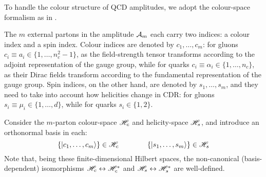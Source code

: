 To handle the colour structure of QCD amplitudes, we adopt the colour-space formalism as in \cite{Catani-1997}.

The $ m $ external partons in the amplitude $ \mathcal{A}_m $ each carry two indices: a colour index and a spin index. Colour indices are denoted by $ c_1, \dots, c_m $: for gluons $ c_i \equiv a_i \in \{1, \dots, n_c^2 - 1\} $, as the field-strength tensor  transforms according to the adjoint representation of the gauge group, while for quarks $ c_i \equiv \alpha_i \in \{1, \dots, n_c\} $, as their Dirac fields transform according to the fundamental representation of the gauge group. Spin indices, on the other hand, are denoted by $ s_1, \dots, s_m $, and they need to take into account how helicities change in CDR: for gluons $ s_i \equiv \mu_i \in \{1, \dots, d\} $, while for quarks $ s_i \in \{1,2\} $.

Consider the $ m $-parton colour-space $ \mathscr{H}_c $ and helicity-space $ \mathscr{H}_s $, and introduce an orthonormal basis in each:
\begin{equation*}
  \{\ket{c_1, \dots, c_m}\} \in \mathscr{H}_c
  \qquad \qquad
  \{\ket{s_1, \dots, s_m}\} \in \mathscr{H}_s
\end{equation*}
Note that, being these finite-dimensional Hilbert spaces, the non-canonical (basis-dependent) isomorphisms $ \mathscr{H}_c \leftrightarrow \mathscr{H}_c^* $ and $ \mathscr{H}_s \leftrightarrow \mathscr{H}_s^* $ are well-defined\footnotemark.


